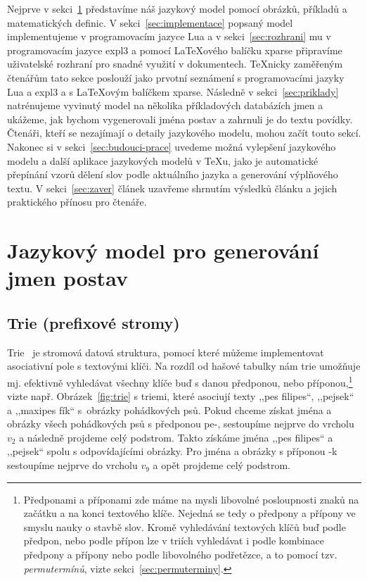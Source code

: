 \documentclass{csbulletin}
\newcommand\vref[1]{\ref{#1} na straně~\pageref{#1}}
\let\vref=\ref
\begin{document}
Nejprve v sekci~\ref{sec:definice} představíme náš jazykový model pomocí obrázků, příkladů a matematických definic. V sekci~\vref{sec:implementace} popsaný model implementujeme v programovacím jazyce Lua a v sekci~\vref{sec:rozhrani} mu v programovacím jazyce expl3 a pomocí \LaTeX ového balíčku xparse připravíme uživatelské rozhraní pro snadné využití v dokumentech. \TeX nicky zaměřeným čtenářům tato sekce poslouží jako prvotní seznámení s programovacími jazyky Lua a expl3 a s \LaTeX ovým balíčkem xparse. Následně v sekci~\vref{sec:priklady} natrénujeme vyvinutý model na několika příkladových databázích jmen a ukážeme, jak bychom vygenerovali jména postav a zahrnuli je do textu povídky. Čtenáři, kteří se nezajímají o detaily jazykového modelu, mohou začít touto sekcí. Nakonec si v sekci~\vref{sec:budouci-prace} uvedeme možná vylepšení jazykového modelu a další aplikace jazykových modelů v \TeX u, jako je automatické přepínání vzorů dělení slov podle aktuálního jazyka a generování výplňového textu. V sekci~\vref{sec:zaver} článek uzavřeme shrnutím výsledků článku a jejich praktického přínosu pro čtenáře.

\section{Jazykový model pro generování jmen postav}
\label{sec:definice}

\subsection{Trie (prefixové stromy)}
Trie~\cite{knuth1997digital} je stromová datová struktura, pomocí které můžeme implementovat asociativní pole s textovými klíči. Na rozdíl od hašové tabulky nám trie umožňuje mj. efektivně vyhledávat všechny klíče buď s danou předponou, nebo příponou,\footnote{Předponami a příponami zde máme na mysli libovolné posloupnosti znaků na začátku a na konci textového klíče. Nejedná se tedy o předpony a přípony ve smyslu nauky o stavbě slov. Kromě vyhledávání textových klíčů buď podle předpon, nebo podle přípon lze v triích vyhledávat i podle kombinace předpony a přípony nebo podle libovolného podřetězce, a to pomocí tzv. \emph{permutermínů}, vizte sekci~\vref{sec:permuterminy}.} vizte např. Obrázek~\ref{fig:trie} s triemi, které asociují texty ,,pes filipes``, ,,pejsek`` a ,,maxipes fík`` s~obrázky pohádkových psů. Pokud chceme získat jména a obrázky všech pohádkových psů s předponou pe-, sestoupíme nejprve do vrcholu $v_2$ a následně projdeme celý podstrom. Takto získáme jména ,,pes filipes`` a ,,pejsek`` spolu s odpovídajícími obrázky. Pro jména a obrázky s příponou -k sestoupíme nejprve do vrcholu $v_9$ a opět projdeme celý podstrom.
\end{document}

